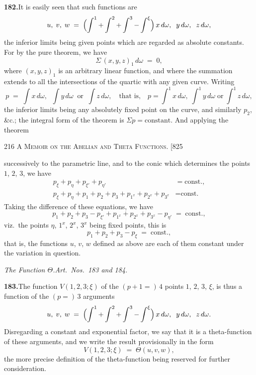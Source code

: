 \documentclass[11pt]{article}
\begin{document}
\medskip
\textbf{182.}\quad It is easily seen that such functions are
\[
u,\;v,\;w \;=\; \Bigl(\int^{1}+\int^{2}+\int^{3}-\int^{\xi}\Bigr)\,x\,d\omega,\;\;y\,d\omega,\;\;z\,d\omega,
\]
the inferior limits being given points which are regarded as absolute constants.  For
by the pure theorem, we have
\[
\Sigma\,(x,y,z)_{1}\,d\omega \;=\; 0,
\]
where $(x,y,z)_{1}$ is an arbitrary linear function, and where the summation extends to
all the intersections of the quartic with any given curve.  Writing
\[
p \;=\; \int x\,d\omega,\;\;\int y\,d\omega\;\;\text{or}\;\;\int z\,d\omega,\quad\text{that is,}\quad p = \!\int^{1}\!x\,d\omega,\;\int^{1}\!y\,d\omega\;\text{or}\;\int^{1}\!z\,d\omega,
\]
the inferior limits being any absolutely fixed point on the curve, and similarly
$p_{2}$, \&c.; the integral form of the theorem is $\Sigma p = \text{constant}$.  And applying the theorem

\newpage
\noindent\textsc{216 \hfill A Memoir on the Abelian and Theta Functions. \hfill [825}
\vspace{0.6em}

\noindent
successively to the parametric line, and to the conic which determines the points
$1$, $2$, $3$, we have
\begin{align*}
p_{\xi}+p_{\eta}+p_{\xi'}+p_{\eta'} &= \text{const.},\\
p_{\xi}+p_{\eta}+p_{1}+p_{2}+p_{3}+p_{1^{x}}+p_{2^{x}}+p_{3^{x}} &= \text{const.}
\end{align*}
Taking the difference of these equations, we have
\[
p_{1}+p_{2}+p_{3}-p_{\xi'}+p_{1^{x}}+p_{2^{x}}+p_{3^{x}}-p_{\eta'} \;=\; \text{const.},
\]
viz.\ the points $\eta$, $1^{x}$, $2^{x}$, $3^{x}$ being fixed points, this is
\[
p_{1}+p_{2}+p_{3}-p_{\xi} \;=\; \text{const.},
\]
that is, the functions $u$, $v$, $w$ defined as above are each of them constant under the
variation in question.

\bigskip
\begin{center}\textit{The Function $\Theta$.\quad Art.\ Nos.\ 183 and 184.}\end{center}

\textbf{183.}\quad The function $V(1,2,3;\xi)$ of the $(p+1=)\,4$ points $1$, $2$, $3$, $\xi$, is thus a
function of the $(p=)\,3$ arguments
\[
u,\;v,\;w \;=\; \Bigl(\int^{1}+\int^{2}+\int^{3}-\int^{\xi}\Bigr)\,x\,d\omega,\;\;y\,d\omega,\;\;z\,d\omega.
\]
Disregarding a constant and exponential factor, we say that it is a theta-function of
these arguments, and we write the result provisionally in the form
\[
V(1,2,3;\xi) \;=\; \Theta(u,v,w),
\]
the more precise definition of the theta-function being reserved for further con\-sideration.
\end{document}
